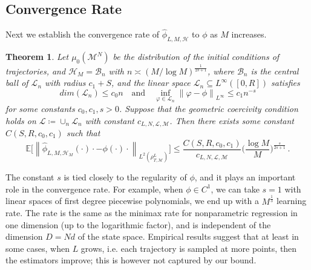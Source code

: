 \documentclass[11pt]{article}
\newtheorem{theorem}{Theorem}[section]
\newcommand{\mbf}[1]{\boldsymbol{#1}}
\newcommand{\norm}[1]{\left\| #1 \right\|}
\newcommand{\bX}{\mbf{X}}
\newcommand{\mB}{\mathcal{B}}
\newcommand{\mH}{\mathcal{H}}
\newcommand{\mL}{\mathcal{L}}
\newcommand{\mM}{\mathcal{M}}
\newcommand{\sdim}{d} %
\newcommand{\intkernel}{\phi}
\newcommand{\lintkernel}{\widehat{\intkernel}}
\newcommand{\intkernelvar}{\varphi}
\newcommand{\E}{\mathbb{E}}
\newcommand{\probIC}{\mu_0}
\newcommand{\muX}{\probIC(\mM^N)}
\newcommand{\mand}{\quad \text{and} \quad}
\begin{document}
\subsection{Convergence Rate} \label{sec:learningrate}
%
Next we establish the convergence rate of $\lintkernel_{L, M, \mH}$ to $\intkernel$ as $M$ increases. 		
\begin{theorem}\label{optimal rate of convergence}
Let $\muX$ be the distribution of the initial conditions of trajectories, and $\mH_M = \mB_n$ with $n \asymp ({M}/{\log M})^{\frac{1}{2s + 1}}$, where $\mB_{n}$ is the central ball of $\mL_n$ with radius $c_1 + S$, and the linear space $\mL_n \subseteq L^{\infty}([0,R])$ satisfies
  \[
    dim(\mL_n) \leq c_0n \mand \inf\limits_{\intkernelvar \in \mathcal{L}_n} \norm{\intkernelvar - \intkernel}_{L^{\infty}} \leq c_1n^{-s}
  \]
  for some constants $c_0, c_1, s > 0$. Suppose that the geometric coercivity condition holds on $\mathcal{L}\coloneqq\cup_n \mL_n$ with constant $c_{L, N, \mathcal{L}, \mM}$.  Then there exists some constant $C(S, R, c_0, c_1)$ such that %
  \[
  \E\Big[\norm{\lintkernel_{L, M, \mH_M}(\cdot)\cdot - \intkernel(\cdot)\cdot}_{L^2(\rho_{T, \mM}^L)}\Big] \le \frac{C(S, R, c_0, c_1)}{c_{L, N, \mathcal{L}, \mM}}\Big(\frac{\log M}{M}\Big)^{\frac{s}{2s + 1}}\,.
  \]
\end{theorem}
The constant $s$ is tied closely to the regularity of $\intkernel$, and it plays an important role in the convergence rate.  For example, when $\intkernel \in C^1$, we can take $s = 1$ with linear spaces of first degree piecewise polynomials, we end up with a $M^{\frac{1}{3}}$ learning rate.
The rate is the same as the minimax rate for nonparametric regression in one dimension (up to the logarithmic factor), and is independent of the dimension $D = N\sdim$ of the state space.   Empirical results suggest that at least in some cases, when $L$ grows, i.e. each trajectory is sampled at more points, then the estimators improve; this is however not captured by our bound.  
%
\end{document}
